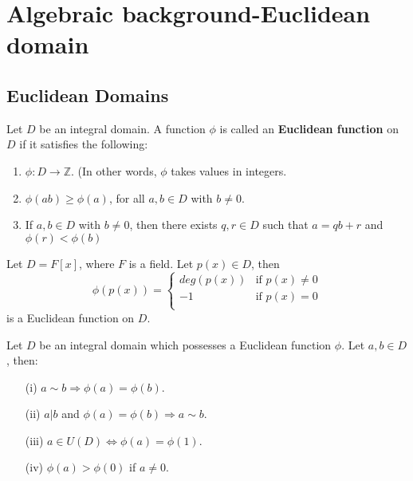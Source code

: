 \section{Algebraic background-Euclidean domain}
\subsection{Euclidean Domains}
\begin{definition} Let $D$ be an integral domain. A function $\phi$ is called an {\bf Euclidean function} on $D$ if it satisfies the following:
\begin{enumerate}
\item $\phi: D \rightarrow \mathbb{Z}$. (In other words, $\phi$ takes values in integers.
\item $\phi(ab) \ge \phi(a)$, for all $a,b \in D$ with $b \neq 0$.
\item If $a,b \in D$ with $b \neq 0$, then there exists $q,r \in D$ such that
$a=qb+r$ and $\phi(r) < \phi(b)$
\end{enumerate}
\end{definition}
\begin{example} Let $D=F[x]$, where $F$ is a field. Let $p(x) \in D$, then
\begin{equation*}
\phi(p(x))= \left\{
\begin{array}{ll}
deg(p(x)) & \text{if } p(x) \neq 0\\
-1 & \text{if } p(x)=0\\
\end{array} \right.
\end{equation*}
is a Euclidean function on $D$.
\end{example}
\begin{lemma} Let $D$ be an integral domain which possesses a Euclidean function $\phi$. Let $a,b \in D$, then:
\begin{enumerate}
\item[(i)] $a \sim b \Rightarrow \phi(a)=\phi(b)$.
\item[(ii)] $a|b$ and $\phi(a)=\phi(b) \Rightarrow a \sim b$.
\item[(iii)] $a \in U(D) \iff \phi(a)=\phi(1)$.
\item[(iv)] $\phi(a) >\phi(0)$ if $a \neq 0$.
\end{enumerate}
\end{lemma}
